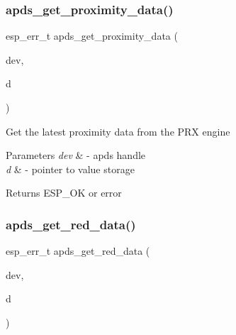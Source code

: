\subsubsection{\texorpdfstring{apds\+\_\+get\+\_\+proximity\+\_\+data()}{apds\_get\_proximity\_data()}}
{\footnotesize\ttfamily esp\+\_\+err\+\_\+t apds\+\_\+get\+\_\+proximity\+\_\+data (\begin{DoxyParamCaption}\item[{\hyperlink{structAPDS9960__Driver}{A\+P\+D\+S\+\_\+\+D\+EV}}]{dev,  }\item[{\hyperlink{vl53l0x__types_8h_aba7bc1797add20fe3efdf37ced1182c5}{uint8\+\_\+t} $\ast$}]{d }\end{DoxyParamCaption})}




\begin{DoxyItemize}
\item Get the latest proximity data from the P\+RX engine 
\end{DoxyItemize}


\begin{DoxyParams}{Parameters}
{\em dev} & -\/ apds handle \\
\hline
{\em d} & -\/ pointer to value storage \\
\hline
\end{DoxyParams}
\begin{DoxyReturn}{Returns}
E\+S\+P\+\_\+\+OK or error 
\end{DoxyReturn}
\mbox{\label{group__APDS9960__DataFunctions_gac0d065ad91f2a8b597b428dd42476eb5}} 
\subsubsection{\texorpdfstring{apds\+\_\+get\+\_\+red\+\_\+data()}{apds\_get\_red\_data()}}
{\footnotesize\ttfamily esp\+\_\+err\+\_\+t apds\+\_\+get\+\_\+red\+\_\+data (\begin{DoxyParamCaption}\item[{\hyperlink{structAPDS9960__Driver}{A\+P\+D\+S\+\_\+\+D\+EV}}]{dev,  }\item[{\hyperlink{vl53l0x__types_8h_a273cf69d639a59973b6019625df33e30}{uint16\+\_\+t} $\ast$}]{d }\end{DoxyParamCaption})}




